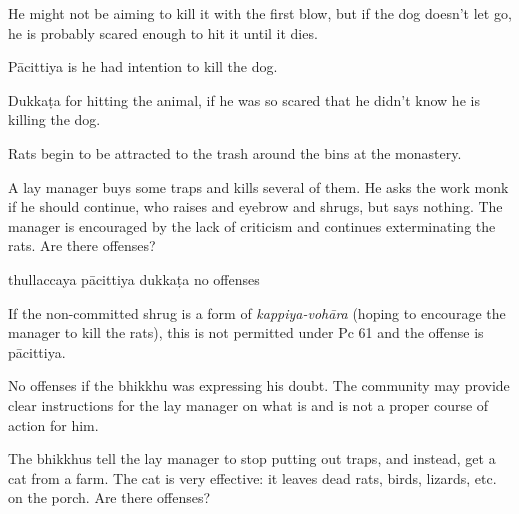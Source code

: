 \begin{exam}{\autoExamName}
\begin{problem*}
\begin{parts}
    \begin{solution}
      He might not be aiming to kill it with the first blow, but if the dog doesn't let go, he is probably scared enough to hit it until it dies.

      Pācittiya is he had intention to kill the dog.

      Dukkaṭa for hitting the animal, if he was so scared that he didn't know he is killing the dog.
    \end{solution}

  \end{parts}

\end{problem*}

\problemDivide

\begin{problem*}

  Rats begin to be attracted to the trash around the bins at the monastery.

  \bigskip

  \begin{parts}

    \item A lay manager buys some traps and kills several of them. He asks the work monk if he should continue, who raises and eyebrow and shrugs, but says nothing. The manager is encouraged by the lack of criticism and continues exterminating the rats. Are there offenses?

    \bigskip

    \begin{answers}{4}
      \bChoices
       thullaccaya \eAns
       pācittiya\eAns
       dukkaṭa\eAns
       no offenses\eAns
      \eChoices
    \end{answers}

    \begin{solution}
      If the non-committed shrug is a form of \emph{kappiya-vohāra} (hoping to encourage the manager to kill the rats), this is not permitted under Pc 61 and the offense is pācittiya.

      No offenses if the bhikkhu was expressing his doubt.
      The community may provide clear instructions for the lay manager on what is and is not a proper course of action for him.
    \end{solution}

    \bigskip

    \item The bhikkhus tell the lay manager to stop putting out traps, and instead, get a cat from a farm. The cat is very effective: it leaves dead rats, birds, lizards, etc. on the porch. Are there offenses?


\end{parts}
\end{problem*}
\end{exam}
